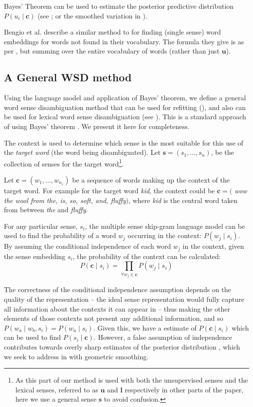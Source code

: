 \documentclass{article}
\def\parencite{\cite}
\renewcommand{\c}{\mathbf{c}}
\newcommand{\s}{\mathbf{s}}
\renewcommand{\l}{\mathbf{l}}
\renewcommand{\u}{\mathbf{u}}
\begin{document}
Bayes' Theorem can be used to estimate the posterior predictive distribution $P(u_i \mid \c)$ (see ; or the smoothed variation in ).

Bengio et al.  describe a similar method to  for finding  (single sense) word embeddings for words not found in their vocabulary.
The formula they give is as per , but summing over the entire vocabulary of words (rather than just $\u$).


\subsection{A General WSD method} \label{generalwsd}
Using the language model and application of Bayes' theorem, we define a general word sense disambiguation method that can be used for refitting (), and also can be used for lexical word sense disambiguation (see ). This is a standard approach of using Bayes' theorem \parencite{tian2014probabilistic,AdaGrams}. We present it here for completeness.

The context is used to determine which sense is the most suitable for this use of the \emph{target word} (the word being disambiguated).
Let $\s=(s_{1},...,s_{n})$, be the collection of senses for the target word\footnote{As this part of our method is used with both the unsupervised senses and the lexical senses, referred to as $\u$ and $\l$ respectively in other parts of the paper, here we use a general sense $\s$ to avoid confusion.}.

Let $\c=(w_{1},...,w_{n_c})$ be a sequence of words making up the context of the target word.
For example for the target word \emph{kid}, the context could be $\c=($ \emph{ wow the wool from the, is, so, soft, and, fluffy}$)$, where \emph{kid} is the central word taken from between \emph{the} and \emph{fluffy}.

For any particular sense, $s_i$, the multiple sense skip-gram language model can be used to
find the probability of a word $w_j$ occurring in the context: $P(w_j \mid s_i)$.
By assuming the conditional independence of each word $w_j$ in the context, given the sense embedding $s_i$, the probability of the context can be calculated:
\begin{equation} \label{eq:contextprobtrue}
P(\c \mid s_{i})=\prod_{\forall w_{j}\in\c}P(w_{j} \mid s_{i})
\end{equation}

The correctness of the conditional independence assumption depends on the quality of the representation -- the ideal sense representation would fully capture all information about the contexts it can appear in -- thus making the other elements of those contexts not present any additional information, and so  $P(w_a \mid w_b,s_i)=P(w_a \mid s_i)$. Given this, we have a estimate of $P(\c \mid s_{i})$ which can be used to find $P(s_i \mid \c)$. However, a false assumption of independence contributes towards overly sharp estimates of the posterior distribution \cite{rosenfeld2000two}, which we seek to address in  with geometric smoothing.
\end{document}
